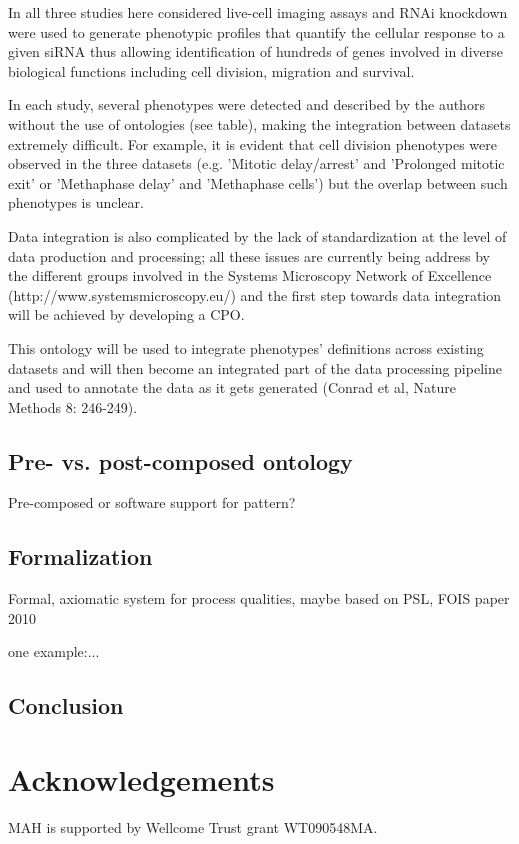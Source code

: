 \documentclass{bioinfo}
\begin{document}
In all three studies here considered live-cell imaging assays and RNAi
knockdown were used to generate phenotypic profiles that quantify the
cellular response to a given siRNA thus allowing identification of
hundreds of genes involved in diverse biological functions including
cell division, migration and survival.

In each study, several phenotypes were detected and described by the
authors without the use of ontologies (see table), making the
integration between datasets extremely difficult. For example, it is
evident that cell division phenotypes were observed in the three
datasets (e.g. 'Mitotic delay/arrest' and 'Prolonged mitotic exit' or
'Methaphase delay' and 'Methaphase cells') but the overlap between
such phenotypes is unclear.

Data integration is also complicated by the lack of standardization at
the level of data production and processing; all these issues are
currently being address by the different groups involved in the
Systems Microscopy Network of Excellence
(http://www.systemsmicroscopy.eu/) and the first step towards data
integration will be achieved by developing a CPO.

This ontology will be used to integrate phenotypes' definitions across
existing datasets and will then become an integrated part of the data
processing pipeline and used to annotate the data as it gets generated
(Conrad et al, Nature Methods 8: 246-249).

\subsection{Pre- vs. post-composed ontology}
Pre-composed or software support for pattern?

\subsection{Formalization}
Formal, axiomatic system for process qualities, maybe based on PSL,
FOIS paper 2010

one example:...

\subsection{Conclusion}

\section{Acknowledgements}
MAH is supported by Wellcome Trust grant WT090548MA.
\end{document}
